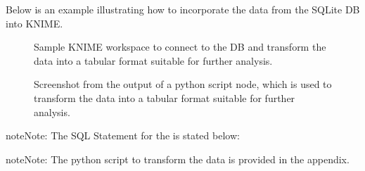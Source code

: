\documentclass[a4paper,10pt,english]{sphinxmanual}
\begin{document}
\sphinxAtStartPar
Below is an example illustrating how to incorporate the data from the SQLite DB into KNIME.

\begin{figure}[htbp]
\centering
\capstart

\noindent{}
\caption{Sample KNIME workspace to connect to the DB and transform the data into a tabular format suitable for further analysis.}\label{\detokenize{TechnicalDetails:id11}}\end{figure}

\begin{figure}[htbp]
\centering
\capstart

\noindent{}
\caption{Screenshot from the output of a python script node, which is used to transform the data into a tabular format suitable for further analysis.}\label{\detokenize{TechnicalDetails:id12}}\end{figure}

\begin{sphinxadmonition}{note}{Note:}
\sphinxAtStartPar
The SQL Statement for the  is stated below:

\begin{sphinxVerbatim}[commandchars=\\\{\}]
\end{sphinxVerbatim}
\end{sphinxadmonition}

\begin{sphinxadmonition}{note}{Note:}
\sphinxAtStartPar
The python script to transform the data is provided in the appendix.
\end{sphinxadmonition}
\end{document}
